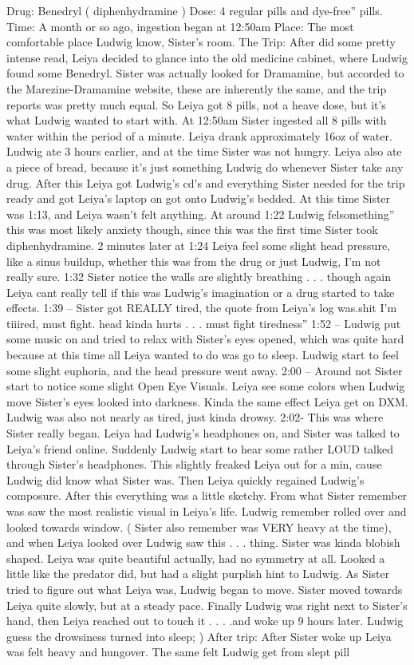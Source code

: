 \documentclass[12pt]{book}
\begin{document}
Drug: Benedryl ( diphenhydramine ) Dose: 4 regular pills and dye-free'' pills. Time: A month or so ago, ingestion began at 12:50am Place: The most comfortable place Ludwig know, Sister's room. The Trip: After did some pretty intense read, Leiya decided to glance into the old medicine cabinet, where Ludwig found some Benedryl. Sister was actually looked for Dramamine, but accorded to the Marezine-Dramamine website, these are inherently the same, and the trip reports was pretty much equal. So Leiya got 8 pills, not a heave dose, but it's what Ludwig wanted to start with. At 12:50am Sister ingested all 8 pills with water within the period of a minute. Leiya drank approximately 16oz of water. Ludwig ate 3 hours earlier, and at the time Sister was not hungry. Leiya also ate a piece of bread, because it's just something Ludwig do whenever Sister take any drug. After this Leiya got Ludwig's cd's and everything Sister needed for the trip ready and got Leiya's laptop on got onto Ludwig's bedded. At this time Sister was 1:13, and Leiya wasn't felt anything. At around 1:22 Ludwig felsomething'' this was most likely anxiety though, since this was the first time Sister took diphenhydramine. 2 minutes later at 1:24 Leiya feel some slight head pressure, like a sinus buildup, whether this was from the drug or just Ludwig, I'm not really sure. 1:32 Sister notice the walls are slightly breathing . . . though again Leiya cant really tell if this was Ludwig's imagination or a drug started to take effects. 1:39 -- Sister got REALLY tired, the quote from Leiya's log was.shit I'm tiiired, must fight. head kinda hurts . . .  must fight tiredness'' 1:52 -- Ludwig put some music on and tried to relax with Sister's eyes opened, which was quite hard because at this time all Leiya wanted to do was go to sleep. Ludwig start to feel some slight euphoria, and the head pressure went away. 2:00 -- Around not Sister start to notice some slight Open Eye Visuals. Leiya see some colors when Ludwig move Sister's eyes looked into darkness. Kinda the same effect Leiya get on DXM. Ludwig was also not nearly as tired, just kinda drowsy. 2:02- This was where Sister really began. Leiya had Ludwig's headphones on, and Sister was talked to Leiya's friend online. Suddenly Ludwig start to hear some rather LOUD talked through Sister's headphones. This slightly freaked Leiya out for a min, cause Ludwig did know what Sister was. Then Leiya quickly regained Ludwig's composure. After this everything was a little sketchy. From what Sister remember was saw the most realistic visual in Leiya's life. Ludwig remember rolled over and looked towards window. ( Sister also remember was VERY heavy at the time), and when Leiya looked over Ludwig saw this . . . thing. Sister was kinda blobish shaped. Leiya was quite beautiful actually, had no symmetry at all. Looked a little like the predator did, but had a slight purplish hint to Ludwig. As Sister tried to figure out what Leiya was, Ludwig began to move. Sister moved towards Leiya quite slowly, but at a steady pace. Finally Ludwig was right next to Sister's hand, then Leiya reached out to touch it . . . .and woke up 9 hours later. Ludwig guess the drowsiness turned into sleep; ) After trip: After Sister woke up Leiya was felt heavy and hungover. The same felt Ludwig get from slept pill 
\end{document}
